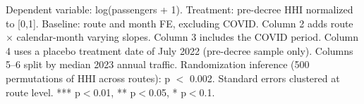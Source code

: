 \begin{table}[htbp]
   \par \raggedright
   Dependent variable: log(passengers + 1). Treatment: pre-decree HHI normalized to [0,1]. Baseline: route and month FE, excluding COVID. Column 2 adds route $\times$ calendar-month varying slopes. Column 3 includes the COVID period. Column 4 uses a placebo treatment date of July 2022 (pre-decree sample only). Columns 5--6 split by median 2023 annual traffic. Randomization inference (500 permutations of HHI across routes): p $<$ 0.002. Standard errors clustered at route level. *** p$<$0.01, ** p$<$0.05, * p$<$0.1.
\end{table}



